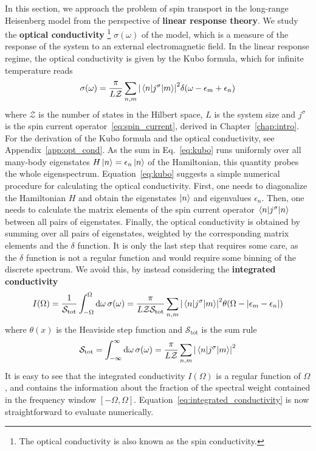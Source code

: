 In this section, we approach the problem of spin transport in the long-range Heisenberg model from the
perspective of \textbf{linear response theory}. We study the \textbf{optical conductivity}
\footnote{The optical conductivity is also known as the spin conductivity.} \(\sigma(\omega)\) of the model,
which is a measure of the response of the system to an external electromagnetic field. 
In the linear response regime, the optical conductivity is given by the Kubo formula, which
for infinite temperature reads
\begin{equation}
  \sigma(\omega) = \frac{\pi}{L \mathcal{Z}} \sum_{n,m} \abs{\mel{n}{j^{\sigma}}{m}}^2 \delta(\omega - \epsilon_m + \epsilon_n)
  \label{eq:kubo}
\end{equation}
where \(\mathcal{Z}\) is the number of states in the Hilbert space, \(L\) is the system size and \(j^{\sigma}\) is the spin
current operator~\eqref{eq:spin_current}, derived in Chapter~\ref{chap:intro}.
For the derivation of the Kubo formula and the optical conductivity, see Appendix~\ref{app:opt_cond}.
As the sum in Eq.~\eqref{eq:kubo} runs 
uniformly over all many-body eigenstates \(H \ket{n} = \epsilon_n \ket{n}\) of the Hamiltonian, this quantity
probes the whole eigenspectrum. Equation~\ref {eq:kubo} suggests a simple numerical procedure for calculating
the optical conductivity. First, one needs to diagonalize the Hamiltonian \(H\) and obtain the eigenstates
\(\ket{n}\) and eigenvalues \(\epsilon_n\). Then, one needs to calculate the matrix elements of the spin current operator
\(\mel{n}{j^{\sigma}}{n}\) between all pairs of eigenstates. Finally, the optical conductivity is obtained by
summing over all pairs of eigenstates, weighted by the corresponding matrix elements and the \(\delta\) function.
It is only the last step that requires some care, as the \(\delta\) function is not a regular function and
would require some binning of the discrete spectrum. We avoid this, by instead considering the
\textbf{integrated conductivity}
\begin{equation}
  I(\Omega) = \frac{1}{\mathcal{S}_{\mathrm{tot}}} \int_{-\Omega}^{\Omega} \dd{\omega} \sigma(\omega) = 
  \frac{\pi}{L \mathcal{Z} \mathcal{S}_{\mathrm{tot}}} \sum_{n,m} \abs{\mel{n}{j^{\sigma}}{m}}^2 \theta(\Omega- \abs{\epsilon_m - \epsilon_n})
  \label{eq:integrated_conductivity}
\end{equation}
where \(\theta(x)\) is the Heaviside step function and  \(\mathcal{S}_{\mathrm{tot}}\) is the sum rule
\begin{equation}
  \mathcal{S}_{\mathrm{tot}} = \int_{-\infty}^{\infty} \dd{\omega} \sigma(\omega) = \frac{\pi}{L \mathcal{Z}} \sum_{n,m} \abs{\mel{n}{j^{\sigma}}{m}}^2
\end{equation}
It is easy to see that the integrated conductivity \(I(\Omega)\) is a regular function of \(\Omega\), and
contains the information about the fraction of the spectral weight contained in the frequency window 
\(\left[-\Omega,\Omega\right]\).
Equation~\eqref{eq:integrated_conductivity} is now straightforward to evaluate numerically.

